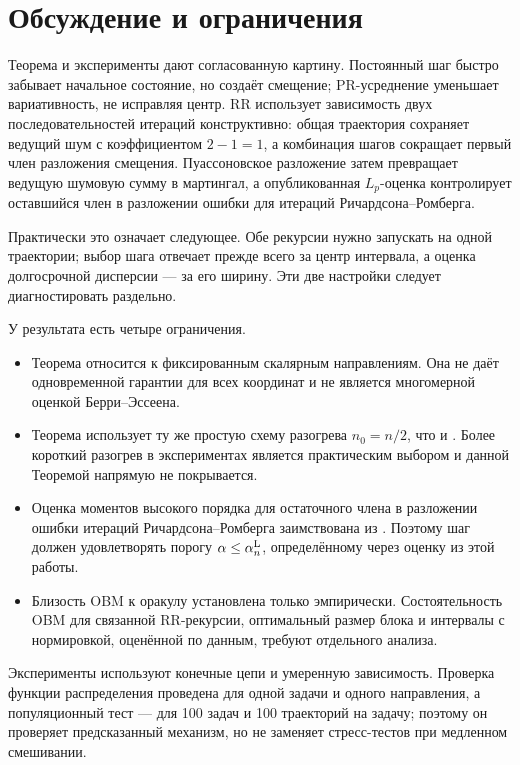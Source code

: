 \section{Обсуждение и ограничения}\label{sec:discussion}

Теорема и эксперименты дают согласованную картину. Постоянный шаг быстро
забывает начальное состояние, но создаёт смещение; PR-усреднение уменьшает
вариативность, не исправляя центр. RR использует зависимость двух
последовательностей итераций
конструктивно: общая траектория сохраняет ведущий шум с коэффициентом
$2-1=1$, а комбинация шагов сокращает первый член разложения смещения.
Пуассоновское разложение затем превращает ведущую шумовую сумму в мартингал,
а опубликованная $L_p$-оценка контролирует оставшийся член в разложении ошибки
для итераций Ричардсона--Ромберга.

Практически это означает следующее. Обе рекурсии нужно запускать на одной
траектории; выбор шага отвечает прежде всего за центр интервала, а оценка
долгосрочной дисперсии --- за его ширину. Эти две настройки следует
диагностировать раздельно.

У результата есть четыре ограничения.

\begin{itemize}
\item Теорема относится к фиксированным скалярным направлениям. Она не даёт
одновременной гарантии для всех координат и не является многомерной оценкой
Берри--Эссеена.
\item Теорема использует ту же простую схему разогрева $n_0=n/2$, что и
\cite[Теорема~2]{Levin2026}. Более короткий разогрев в экспериментах является
практическим выбором и данной Теоремой напрямую не покрывается.
\item Оценка моментов высокого порядка для остаточного члена в разложении
ошибки итераций Ричардсона--Ромберга заимствована из \cite{Levin2026}.
Поэтому шаг должен удовлетворять порогу
$\alpha\leq\alpha_n^{\rm L}$, определённому через оценку из этой работы.
\item Близость OBM к оракулу установлена только эмпирически. Состоятельность
OBM для связанной RR-рекурсии, оптимальный размер блока и интервалы с
нормировкой, оценённой по данным, требуют отдельного анализа.
\end{itemize}

Эксперименты используют конечные цепи и умеренную зависимость. Проверка
функции распределения проведена для одной задачи и одного направления, а
популяционный тест --- для 100 задач и 100 траекторий на задачу; поэтому он
проверяет предсказанный механизм, но не заменяет стресс-тестов при медленном
смешивании.

